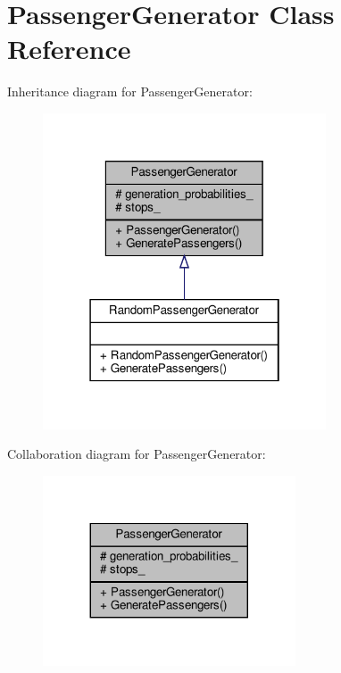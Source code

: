 \hypertarget{classPassengerGenerator}{}\section{Passenger\+Generator Class Reference}
\label{classPassengerGenerator}


Inheritance diagram for Passenger\+Generator\+:
\nopagebreak
\begin{figure}[H]
\begin{center}
\leavevmode
\includegraphics[width=238pt]{classPassengerGenerator__inherit__graph}
\end{center}
\end{figure}


Collaboration diagram for Passenger\+Generator\+:
\nopagebreak
\begin{figure}[H]
\begin{center}
\leavevmode
\includegraphics[width=212pt]{classPassengerGenerator__coll__graph}
\end{center}
\end{figure}
